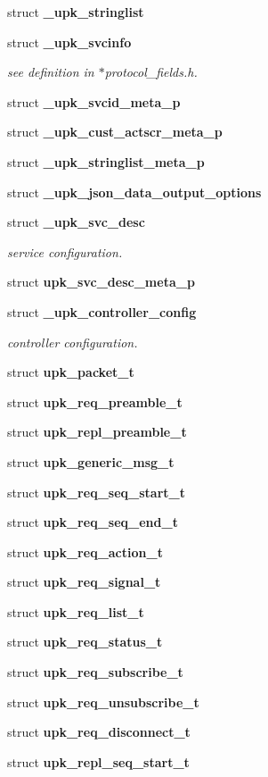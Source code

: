 \begin{DoxyCompactItemize}
struct {\bf \_\-upk\_\-stringlist}
\item 
struct {\bf \_\-upk\_\-svcinfo}
\begin{DoxyCompactList}\small\item\em see definition in $\ast$protocol\_\-fields.h. \end{DoxyCompactList}\item 
struct {\bf \_\-upk\_\-svcid\_\-meta\_\-p}
\item 
struct {\bf \_\-upk\_\-cust\_\-actscr\_\-meta\_\-p}
\item 
struct {\bf \_\-upk\_\-stringlist\_\-meta\_\-p}
\item 
struct {\bf \_\-upk\_\-json\_\-data\_\-output\_\-options}
\item 
struct {\bf \_\-upk\_\-svc\_\-desc}
\begin{DoxyCompactList}\small\item\em service configuration. \end{DoxyCompactList}\item 
struct {\bf upk\_\-svc\_\-desc\_\-meta\_\-p}
\item 
struct {\bf \_\-upk\_\-controller\_\-config}
\begin{DoxyCompactList}\small\item\em controller configuration. \end{DoxyCompactList}\item 
struct {\bf upk\_\-packet\_\-t}
\item 
struct {\bf upk\_\-req\_\-preamble\_\-t}
\item 
struct {\bf upk\_\-repl\_\-preamble\_\-t}
\item 
struct {\bf upk\_\-generic\_\-msg\_\-t}
\item 
struct {\bf upk\_\-req\_\-seq\_\-start\_\-t}
\item 
struct {\bf upk\_\-req\_\-seq\_\-end\_\-t}
\item 
struct {\bf upk\_\-req\_\-action\_\-t}
\item 
struct {\bf upk\_\-req\_\-signal\_\-t}
\item 
struct {\bf upk\_\-req\_\-list\_\-t}
\item 
struct {\bf upk\_\-req\_\-status\_\-t}
\item 
struct {\bf upk\_\-req\_\-subscribe\_\-t}
\item 
struct {\bf upk\_\-req\_\-unsubscribe\_\-t}
\item 
struct {\bf upk\_\-req\_\-disconnect\_\-t}
\item 
struct {\bf upk\_\-repl\_\-seq\_\-start\_\-t}

\end{DoxyCompactItemize}

